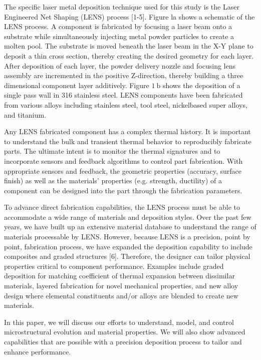 \documentclass[10pt]{article}
\begin{document}
The specific laser metal deposition technique used for this study is the Laser Engineered Net Shaping (LENS) process [1-5]. Figure la shows a schematic of the LENS process. A component is fabricated by focusing a laser beam onto a substrate while simultaneously injecting metal powder particles to create a molten pool. The substrate is moved beneath the laser beam in the X-Y plane to deposit a thin cross section, thereby creating the desired geometry for each layer. After deposition of each layer, the powder delivery nozzle and focusing lens assembly are incremented in the positive Z-direction, thereby building a three dimensional component layer additively. Figure $1 \mathrm{~b}$ shows the deposition of a single pass wall in 316 stainless steel. LENS components have been fabricated from various alloys including stainless steel, tool steel, nickelbased super alloys, and titanium.

Any LENS fabricated component has a complex thermal history. It is important to understand the bulk and transient thermal behavior to reproducibly fabricate parts. The ultimate intent is to monitor the thermal signatures and to incorporate sensors and feedback algorithms to control part fabrication. With appropriate sensors and feedback, the geometric properties (accuracy, surface finish) as well as the materials' properties (e.g. strength, ductility) of a component can be designed into the part through the fabrication parameters.

To advance direct fabrication capabilities, the LENS process must be able to accommodate a wide range of materials and deposition styles. Over the past few years, we have built up an extensive material database to understand the range of materials processable by LENS. However, because LENS is a precision, point by point, fabrication process, we have expanded the deposition capability to include composites and graded structures [6]. Therefore, the designer can tailor physical properties critical to component performance. Examples include graded deposition for matching coefficient of thermal expansion between dissimilar materials, layered fabrication for novel mechanical properties, and new alloy design where elemental constituents and/or alloys are blended to create new materials.

In this paper, we will discuss our efforts to understand, model, and control microstructural evolution and material properties. We will also show advanced capabilities that are possible with a precision deposition process to tailor and enhance performance.
\end{document}
